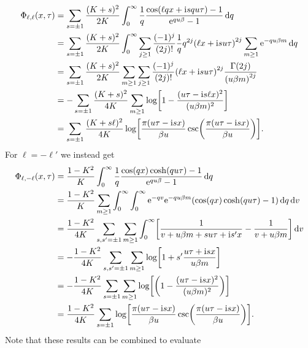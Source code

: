 \documentclass[english, parskip=full]{scrartcl}
\begin{document}
\begin{align}
\Phi_{\ell,\ell}(x,\tau) &= \sum_{s=\pm 1} \frac{(K+s)^2}{2K} \intx{0}{\infty}{ \frac{1}{q} \frac{\cos\kla*{\ell qx + \i squ\tau}-1}{\powe{qu\beta} - 1} }{q}\\
&= \sum_{s=\pm 1} \frac{(K+s)^2}{2K} \intx{0}{\infty}{ \sum_{j\ge 1} \frac{(-1)^j}{(2j)!} \frac{1}{q} q^{2j} \kla*{\ell x + \i su\tau}^{2j} \sum_{m\ge 1} \powe{- qu\beta m} }{q}\\
&= \sum_{s=\pm 1} \frac{(K+s)^2}{2K} \sum_{m\ge 1} \sum_{j\ge 1} \frac{(-1)^j}{(2j)!} \kla*{\ell x + \i su\tau}^{2j} \frac{\Gamma(2j)}{\kla*{u\beta m}^{2j}}\\
&= -\sum_{s=\pm 1} \frac{(K+s)^2}{4K} \sum_{m\ge 1} \log\klb*{1 - \frac{(u\tau - \i s\ell x)^2}{(u\beta m)^2}}\\
&= \sum_{s=\pm 1} \frac{(K+s\ell)^2}{4K} \log \klb*{\frac{\pi (u\tau - \i sx)}{\beta u} \csc\kla*{\frac{\pi (u\tau - \i sx)}{\beta u}}}.
\end{align}
For $\ell=-\ell'$ we instead get
\begin{align}
\Phi_{\ell,-\ell}(x,\tau) &= \frac{1-K^2}{K} \intx{0}{\infty}{\frac{1}{q} \frac{\cos(qx) \cosh(qu\tau) - 1}{\powe{qu\beta} - 1}}{q}\\
&= \frac{1-K^2}{K} \sum_{m\ge 1} \intx{0}{\infty}{\intx{0}{\infty}{\powe{-qv} \powe{-qu\beta m} \kla*{\cos(qx) \cosh(qu\tau) - 1}}{q} }{v}\\
&= \frac{1-K^2}{4K} \sum_{s,s'=\pm 1} \sum_{m\ge 1} \intx{0}{\infty}{ \klb*{\frac{1}{v + u\beta m + su\tau + \i s' x} - \frac{1}{v + u\beta m}} }{v}\\
&= -\frac{1-K^2}{4K} \sum_{s,s'=\pm 1} \sum_{m\ge 1} \log\klb*{1 + s'\frac{u\tau + \i sx}{u\beta m}}\\
&= -\frac{1 - K^2}{4K} \sum_{s=\pm 1} \sum_{m\ge 1} \log\klb*{\kla*{1 - \frac{(u\tau - \i sx)^2}{(u\beta m)^2}}}\\
&= \frac{1-K^2}{4K} \sum_{s=\pm 1} \log \klb*{\frac{\pi (u\tau - \i sx)}{\beta u} \csc\kla*{\frac{\pi (u\tau - \i sx)}{\beta u}}}.
\end{align}
Note that these results can be combined to evaluate
\end{document}
